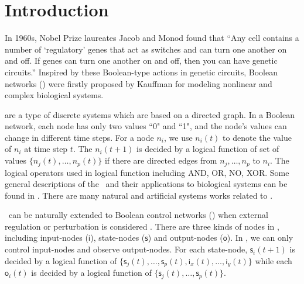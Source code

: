 \section{Introduction}
\label{sec:intro}


In 1960s, Nobel Prize laureates Jacob and Monod found that ``Any cell contains a number of `regulatory' genes that act as switches and can turn one another on and off. If genes can turn one another on and off, then you can have genetic circuits.''\cite{Jacob1961Genetic} Inspired by these Boolean-type actions in genetic circuits, Boolean networks (\BNs) were firstly proposed by Kauffman \cite{Kauffman1968Metabolic} for modeling nonlinear and complex biological systems. 

{\BNs} are a type of discrete systems which are based on a directed graph. In a Boolean network, each node has only two values ``0" and ``1", and
the node's values can change in different time steps.  For a node $n_i$, we use $n_i(t)$ to denote the value of $n_i$ at time step $t$.
%
The $n_i(t+1)$ is decided by a logical function of  set of  values  $\{n_j(t),\ldots,n_p(t)\}$ if  there are directed edges from $n_j,\ldots,n_p$ to $n_i$.  %
 The logical operators used in  logical function including AND, OR, NO, XOR. %
Some general descriptions of the \BNs\ and their applications to biological systems can be found in \cite{Kauffman1968Metabolic}.
There are many natural and artificial systems works \cite{Akutsu2000Inferring, Shmulevich2002From, Faur2006Dynamical,Green2007The,Lou2010Multi} related to \BNs.
 

\BNs\ can be naturally extended to Boolean control networks (\BCNs) when external regulation or perturbation is considered \cite{Ideker2001A}. There are three kinds of nodes in \BCNs, including input-nodes ($\mathsf{i}$), state-nodes ($\mathsf{s}$) and output-nodes ($\mathsf{o}$). In \BCNs, we can only control input-nodes and observe output-nodes. 
For each state-node, $\mathsf{s}_i(t+1)$ is decided by a logical function of  $\{\mathsf{s}_j(t),\ldots,\mathsf{s}_p(t),\mathsf{i}_x(t),\ldots,\mathsf{i}_y(t)\}$  %
while each $\mathsf{o}_i(t)$ is decided by a logical function of   $\{\mathsf{s}_j(t),\ldots,\mathsf{s}_p(t)\}$. 

